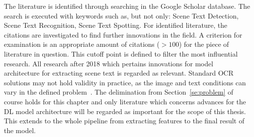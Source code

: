 The literature is identified through searching in the Google Scholar database.
The search is executed with keywords such as, but not only: Scene Text Detection,
Scene Text Recognition, Scene Text Spotting.
For identified literature, the citations are investigated to find further innovations in the field.
A criterion for examination is an appropriate amount of citations ($>100$) for the piece of
literature in question.
This cutoff point is defined to filter the most influential research.
All research after 2018 which pertains innovations for model architecture for extracting scene
text is regarded as relevant.
Standard \ac{OCR} solutions may not hold validity in practice, as the image and text conditions can
vary in the defined problem~\citep{chen_text_2021}.
The delimination from Section~\ref{se:problem} of course holds for this chapter and only literature
which concerns advances for the \ac{DL} model architecture will be regarded as important for the
scope of this thesis.
This extends to the whole pipeline from extracting features to the final result of the model.

